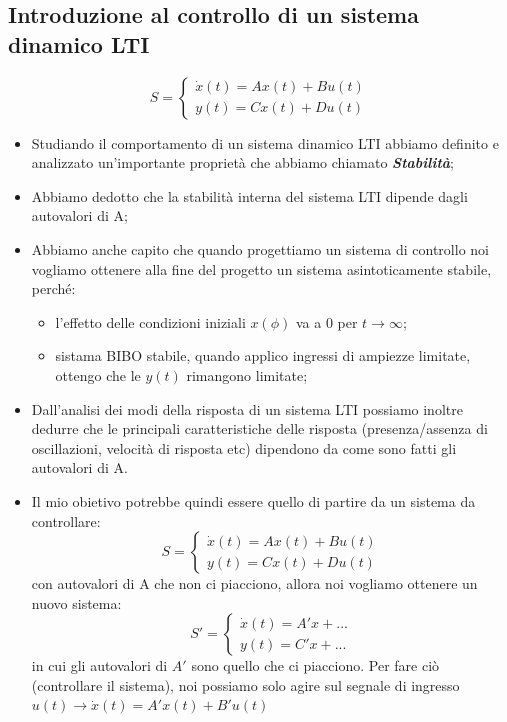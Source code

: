 \subsection{Introduzione al controllo di un sistema dinamico LTI}
\begin{equation}
    S = \begin{cases}
        \dot{x}(t) = A x(t) + B u(t) \\
        y(t) = C x(t) + D u(t)
    \end{cases}
\end{equation}
\begin{itemize}
    \item Studiando il comportamento di un sistema dinamico LTI abbiamo definito e
          analizzato un'importante proprietà che abbiamo chiamato
          \textbf{\textit{Stabilità}};
    \item Abbiamo dedotto che la stabilità interna del sistema LTI dipende dagli
          autovalori di A;
    \item Abbiamo anche capito che quando progettiamo un sistema di controllo noi
          vogliamo ottenere alla fine del progetto un sistema asintoticamente stabile,
          perché:\begin{itemize}
              \item l'effetto delle condizioni iniziali $x(\phi)$ va a 0 per $t \to \infty$;
              \item sistama BIBO stabile, quando applico ingressi di ampiezze limitate, ottengo che
                    le $y(t)$ rimangono limitate;
          \end{itemize}
    \item Dall'analisi dei modi della risposta di un sistema LTI possiamo inoltre dedurre
          che le principali caratteristiche delle risposta (presenza/assenza di
          oscillazioni, velocità di risposta etc) dipendono da come sono fatti gli
          autovalori di A.
    \item Il mio obietivo potrebbe quindi essere quello di partire da un sistema da
          controllare:
          \begin{equation}
              S = \begin{cases}
                  \dot{x}(t) = A x(t) + B u(t) \\
                  y(t) = C x(t) + D u(t)
              \end{cases}
          \end{equation}
          con autovalori di A che non ci piacciono, allora noi vogliamo ottenere
          un nuovo sistema:
          \begin{equation}        S' = \begin{cases}
                  \dot{x}(t) = A' x + ... \\
                  y(t) = C' x + ...
              \end{cases}
          \end{equation}
          in cui gli autovalori di $A'$ sono quello che ci piacciono. Per fare
          ciò (controllare il sistema), noi possiamo solo agire sul segnale di
          ingresso $u(t)\rightarrow \dot{x}(t)=A'x(t)+B'u(t)$


\end{itemize}

